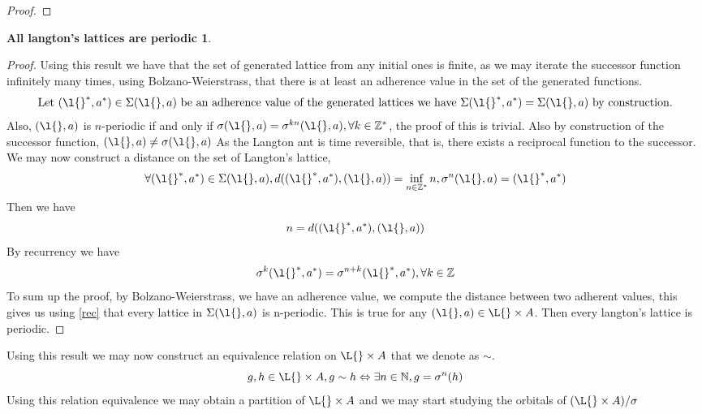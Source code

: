 \documentclass[a4paper,10pt]{article}
\begin{document}
\begin{adher}
\begin{proof}
 



\end{proof}
\end{adher}


\newtheorem{nper}{All langton's lattices are periodic}
\begin{nper}

\end{nper}
\begin{proof}

 

Using this result we have that the set of generated lattice from any initial ones is finite, as we may iterate the successor function infinitely many times, using Bolzano-Weierstrass, 
that there is at least an adherence value in the set of the generated functions.
\begin{equation}
 \text{Let } (\l{}^*, a^*) \in \Sigma(\l{}, a)\text{ be an adherence value of the generated lattices we have } \Sigma(\l{}^*, a^*) = \Sigma(\l{}, a) \text{ by construction.}
\end{equation}
Also, $(\l{}, a)$ is $n$-periodic if and only if $\sigma(\l{}, a) = \sigma^{kn}(\l{}, a), \forall k \in \mathbb{Z^*}$, the proof of this is trivial.
Also by construction of the successor function, $(\l{}, a) \neq \sigma(\l{}, a) $
As the Langton ant is time reversible, that is, there exists a reciprocal function to the successor.
We may now construct a distance on the set of Langton's lattice,
\begin{equation}
 \forall (\l{}^*, a^*) \in \Sigma(\l{}, a), d((\l{}^*, a^*), (\l{}, a)) = \inf_{n \in \mathbb{Z}^*}{n, \sigma^n(\l{}, a) = (\l{}^*, a^*)} 
\end{equation}
Then we have
\begin{equation}
 n = d((\l{}^*, a^*), (\l{}, a)) 
\end{equation}
By recurrency we have 
\begin{equation}
 \label{rec}
 \sigma^k(\l{}^*, a^*) = \sigma^{n+k}(\l{}^*, a^*), \forall k \in \mathbb{Z}
\end{equation}
To sum up the proof, by Bolzano-Weierstrass, we have an adherence value, we compute the distance between two adherent values, this gives us using \ref{rec} that every lattice in $\Sigma(\l{}, a)$
is n-periodic. This is true for any $(\l{},a) \in \L{} \times A$. Then every langton's lattice is periodic.
\end{proof}

Using this result we may now construct an equivalence relation on $\L{}\times A$ that we denote as $\sim$.
\begin{equation}
 g,h \in \L{} \times A, g \sim h \Leftrightarrow \exists n \in \mathbb{N}, g=\sigma^n(h)
\end{equation}
Using this relation equivalence we may obtain a partition of $\L{} \times A$  and we may start studying the orbitals of $(\L{} \times A)/\sigma$
\end{document}
